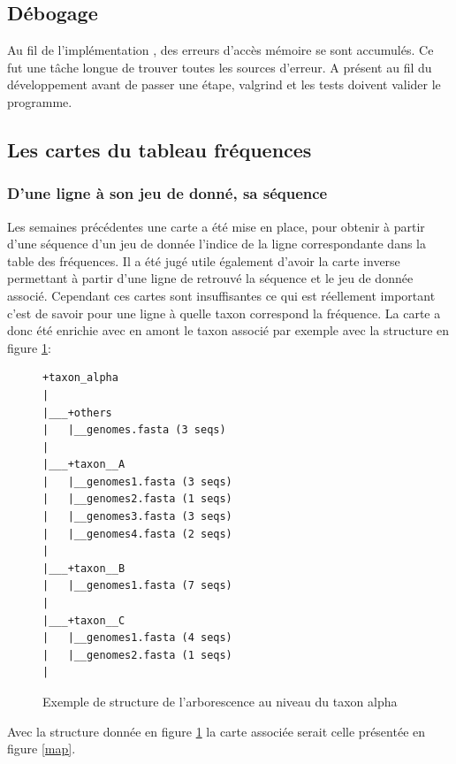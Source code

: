 \subsection{Débogage}

Au fil de l'implémentation , des erreurs d'accès mémoire se sont accumulés. Ce fut une tâche longue de trouver toutes les sources d'erreur. A présent au fil du développement avant de passer une étape, valgrind et les tests doivent valider le programme. 

\subsection{Les cartes du tableau fréquences}

\subsubsection{D'une ligne à son jeu de donné, sa séquence}
Les semaines précédentes une carte a été mise en place, pour obtenir à partir d'une séquence d'un jeu de donnée l'indice de la ligne correspondante dans la table des fréquences.
Il a été jugé utile également d'avoir la carte inverse permettant à partir d'une ligne de retrouvé la séquence et le jeu de donnée associé. Cependant ces cartes sont insuffisantes ce qui est réellement important c'est de savoir pour une ligne à quelle taxon correspond la fréquence. La carte a donc été enrichie avec en amont le taxon associé par exemple avec la structure en figure \ref{struct}:

  

\begin{figure}[H]
\centering
\begin{varwidth}{\linewidth}
\begin{verbatim}
+taxon_alpha
|
|___+others
|   |__genomes.fasta (3 seqs)
|   
|___+taxon__A
|   |__genomes1.fasta (3 seqs)
|   |__genomes2.fasta (1 seqs)
|   |__genomes3.fasta (3 seqs)
|   |__genomes4.fasta (2 seqs)
|   
|___+taxon__B
|   |__genomes1.fasta (7 seqs)
|   
|___+taxon__C
|   |__genomes1.fasta (4 seqs)
|   |__genomes2.fasta (1 seqs)
|

\end{verbatim}
\end{varwidth}
\caption[Structure au niveau du taxon alpha]{\label{struct}Exemple de structure de l'arborescence au niveau du taxon alpha}
\end{figure}

Avec la structure donnée en figure \ref{struct} la carte associée serait celle présentée en figure \ref{map}.

